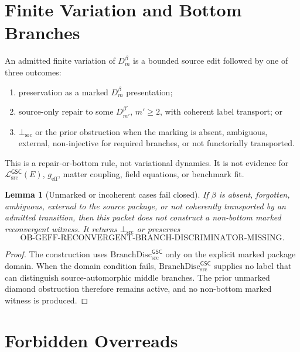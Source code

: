 \documentclass[11pt]{article}
\newcommand{\MetricData}{\mathcal{L}_{\mathrm{src}}^{\mathsf{GSC}}}
\newcommand{\BottomSrc}{\bot_{\mathrm{src}}}
\newcommand{\geff}{g_{\mathrm{eff}}}
\newcommand{\BranchDisc}{\mathrm{BranchDisc}_{\mathrm{src}}^{\mathsf{GSC}}}
\newcommand{\Dmbeta}{D_m^{\beta}}
\newtheorem{lemma}{Lemma}
\begin{document}
\section{Finite Variation and Bottom Branches}

An admitted finite variation of \(\Dmbeta\) is a bounded source edit followed
by one of three outcomes:
\begin{enumerate}[leftmargin=*]
  \item preservation as a marked \(\Dmbeta\) presentation;
  \item source-only repair to some \(D_{m'}^{\beta'}\), \(m'\ge 2\), with
  coherent label transport; or
  \item \(\BottomSrc\) or the prior obstruction when the marking is absent,
  ambiguous, external, non-injective for required branches, or not
  functorially transported.
\end{enumerate}

This is a repair-or-bottom rule, not variational dynamics. It is not evidence
for \(\MetricData(E)\), \(\geff\), matter coupling, field equations, or
benchmark fit.

\begin{lemma}[Unmarked or incoherent cases fail closed]
If \(\beta\) is absent, forgotten, ambiguous, external to the source package,
or not coherently transported by an admitted transition, then this packet does
not construct a non-bottom marked reconvergent witness. It returns
\(\BottomSrc\) or preserves
\[
\mathrm{OB\mbox{-}GEFF\mbox{-}RECONVERGENT\mbox{-}BRANCH\mbox{-}DISCRIMINATOR\mbox{-}MISSING}.
\]
\end{lemma}

\begin{proof}
The construction uses \(\BranchDisc\) only on the explicit marked package
domain. When the domain condition fails, \(\BranchDisc\) supplies no label
that can distinguish source-automorphic middle branches. The prior unmarked
diamond obstruction therefore remains active, and no non-bottom marked witness
is produced.
\end{proof}

\section{Forbidden Overreads}
\end{document}
